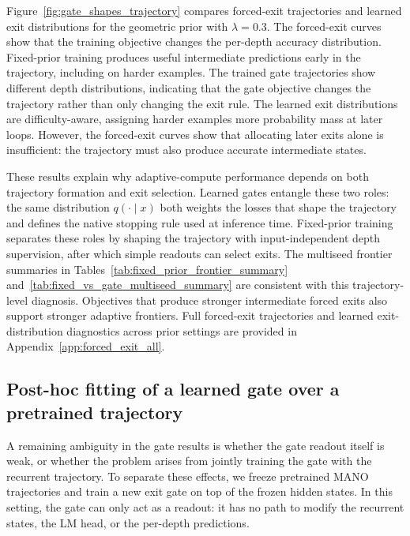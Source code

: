 \documentclass[10pt]{article} %
\begin{document}
Figure~\ref{fig:gate_shapes_trajectory} compares forced-exit trajectories and learned exit distributions for the geometric prior with \(\lambda=0.3\). The forced-exit curves show that the training objective changes the per-depth accuracy distribution. Fixed-prior training produces useful intermediate predictions early in the trajectory, including on harder examples. The trained gate trajectories show different depth distributions, indicating that the gate objective changes the trajectory rather than only changing the exit rule. The learned exit distributions are difficulty-aware, assigning harder examples more probability mass at later loops. However, the forced-exit curves show that allocating later exits alone is insufficient: the trajectory must also produce accurate intermediate states.

These results explain why adaptive-compute performance depends on both trajectory formation and exit selection. Learned gates entangle these two roles: the same distribution \(q(\cdot\mid x)\) both weights the losses that shape the trajectory and defines the native stopping rule used at inference time. Fixed-prior training separates these roles by shaping the trajectory with input-independent depth supervision, after which simple readouts can select exits. The multiseed frontier summaries in Tables~\ref{tab:fixed_prior_frontier_summary} and~\ref{tab:fixed_vs_gate_multiseed_summary} are consistent with this trajectory-level diagnosis. Objectives that produce stronger intermediate forced exits also support stronger adaptive frontiers. Full forced-exit trajectories and learned exit-distribution diagnostics across prior settings are provided in Appendix~\ref{app:forced_exit_all}.

\subsection{Post-hoc fitting of a learned gate over a pretrained trajectory}
\label{sec:posthoc-gate-fitting}

A remaining ambiguity in the gate results is whether the gate readout itself is weak, or whether the problem arises from jointly training the gate with the recurrent trajectory. To separate these effects, we freeze pretrained MANO trajectories and train a new exit gate on top of the frozen hidden states. In this setting, the gate can only act as a readout: it has no path to modify the recurrent states, the LM head, or the per-depth predictions.
\end{document}
